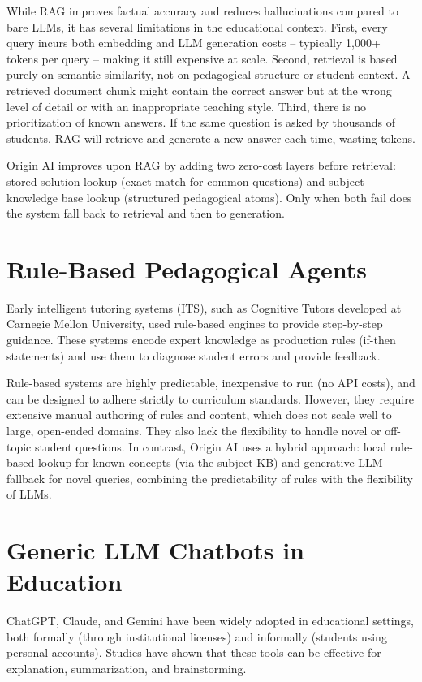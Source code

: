 While RAG improves factual accuracy and reduces hallucinations compared to bare LLMs, it has several limitations in the educational context. First, every query incurs both embedding and LLM generation costs – typically 1,000+ tokens per query – making it still expensive at scale. Second, retrieval is based purely on semantic similarity, not on pedagogical structure or student context. A retrieved document chunk might contain the correct answer but at the wrong level of detail or with an inappropriate teaching style. Third, there is no prioritization of known answers. If the same question is asked by thousands of students, RAG will retrieve and generate a new answer each time, wasting tokens.

Origin AI improves upon RAG by adding two zero-cost layers before retrieval: stored solution lookup (exact match for common questions) and subject knowledge base lookup (structured pedagogical atoms). Only when both fail does the system fall back to retrieval and then to generation.

\section{Rule-Based Pedagogical Agents}

Early intelligent tutoring systems (ITS), such as Cognitive Tutors developed at Carnegie Mellon University, used rule-based engines to provide step-by-step guidance. These systems encode expert knowledge as production rules (if-then statements) and use them to diagnose student errors and provide feedback.

Rule-based systems are highly predictable, inexpensive to run (no API costs), and can be designed to adhere strictly to curriculum standards. However, they require extensive manual authoring of rules and content, which does not scale well to large, open-ended domains. They also lack the flexibility to handle novel or off-topic student questions. In contrast, Origin AI uses a hybrid approach: local rule-based lookup for known concepts (via the subject KB) and generative LLM fallback for novel queries, combining the predictability of rules with the flexibility of LLMs.

\section{Generic LLM Chatbots in Education}

ChatGPT, Claude, and Gemini have been widely adopted in educational settings, both formally (through institutional licenses) and informally (students using personal accounts). Studies have shown that these tools can be effective for explanation, summarization, and brainstorming.


